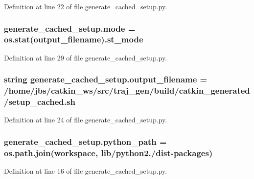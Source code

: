 Definition at line 22 of file generate\+\_\+cached\+\_\+setup.\+py.

\subsubsection[{\texorpdfstring{mode}{mode}}]{\setlength{\rightskip}{0pt plus 5cm}generate\+\_\+cached\+\_\+setup.\+mode = os.\+stat({\bf output\+\_\+filename}).st\+\_\+mode}\hypertarget{namespacegenerate__cached__setup_a10081e5abedae9bd46dd91202096e789}{}\label{namespacegenerate__cached__setup_a10081e5abedae9bd46dd91202096e789}


Definition at line 29 of file generate\+\_\+cached\+\_\+setup.\+py.

\subsubsection[{\texorpdfstring{output\+\_\+filename}{output_filename}}]{\setlength{\rightskip}{0pt plus 5cm}string generate\+\_\+cached\+\_\+setup.\+output\+\_\+filename = \textquotesingle{}/home/jbs/catkin\+\_\+ws/src/traj\+\_\+gen/build/catkin\+\_\+generated/setup\+\_\+cached.\+sh\textquotesingle{}}\hypertarget{namespacegenerate__cached__setup_a0265aee5075ee1eb701ff69c98ad6793}{}\label{namespacegenerate__cached__setup_a0265aee5075ee1eb701ff69c98ad6793}


Definition at line 24 of file generate\+\_\+cached\+\_\+setup.\+py.

\subsubsection[{\texorpdfstring{python\+\_\+path}{python_path}}]{\setlength{\rightskip}{0pt plus 5cm}generate\+\_\+cached\+\_\+setup.\+python\+\_\+path = os.\+path.\+join(workspace, \textquotesingle{}lib/python2./dist-\/packages\textquotesingle{})}\hypertarget{namespacegenerate__cached__setup_a72579fd01529a79bab20d99291889d3f}{}\label{namespacegenerate__cached__setup_a72579fd01529a79bab20d99291889d3f}


Definition at line 16 of file generate\+\_\+cached\+\_\+setup.\+py.

